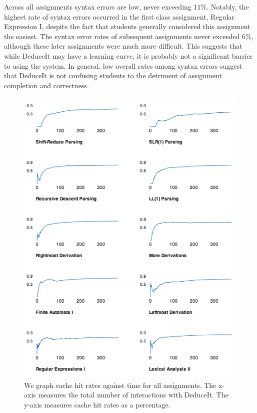 \documentclass{sigchi}
\begin{document}
Across all assignments syntax errors are low, never exceeding $11\%$. Notably, the highest rate of syntax errors occurred in the first class assignment, Regular Expression I, despite the fact that students generally considered this assignment the easiest. The syntax error rates of subsequent assignments never exceeded $6\%$, although these later assignments were much more difficult. This suggests that while DeduceIt may have a learning curve, it is probably not a significant barrier to using the system. In general, low overall rates among syntax errors suggest that DeduceIt is not confusing students to the detriment of assignment completion and correctness.

\begin{figure}[!h]
\centering
\includegraphics[width=1\columnwidth]{proofcache}
\caption{We graph cache hit rates against time for all assignments. The x-axis measures the total number of interactions with DeduceIt. The y-axis measures cache hit rates as a percentage.}
\label{fig:proofcache}
\end{figure}
\end{document}

